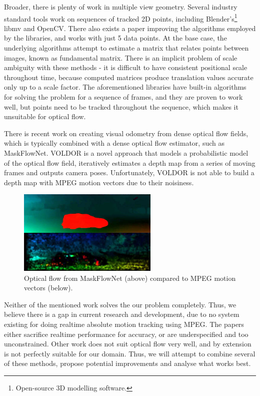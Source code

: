 \documentclass[11pt,english]{report}
\begin{document}
Broader, there is plenty of work in multiple view geometry. Several industry standard tools work on sequences of tracked 2D points, including Blender's\footnote{Open-source 3D modelling software.} libmv\cite{libmv} and OpenCV\cite{opencv5calib}. There also exists a paper improving the algorithms employed by the libraries, and works with just 5 data points\cite{1211470}. At the base case, the underlying algorithms attempt to estimate a matrix that relates points between images, known as fundamental matrix. There is an implicit problem of scale ambiguity\cite{hartley_zisserman_2004} with these methods - it is difficult to have consistent positional scale throughout time, because computed matrices produce translation values accurate only up to a scale factor. The aforementioned libraries have built-in algorithms for solving the problem for a sequence of frames, and they are proven to work well, but points need to be tracked throughout the sequence, which makes it unsuitable for optical flow.

There is recent work on creating visual odometry from dense optical flow fields\cite{voldor}, which is typically combined with a dense optical flow estimator, such as MaskFlowNet\cite{zhao2020maskflownet}. VOLDOR\cite{voldor} is a novel approach that models a probabilistic model of the optical flow field, iteratively estimates a depth map from a series of moving frames and outputs camera poses. Unfortunately, VOLDOR is not able to build a depth map with MPEG motion vectors due to their noisiness.

\begin{figure}[!ht]
	\centering
	\includegraphics[width=190pt]{docs/report/mpeg-maskflownet.jpg}
	\caption{\centering Optical flow from MaskFlowNet (above) compared to MPEG motion vectors (below).}
\end{figure}

Neither of the mentioned work solves the our problem completely. Thus, we believe there is a gap in current research and development, due to no system existing for doing realtime absolute motion tracking using MPEG. The papers either sacrifice realtime performance for accuracy, or are underspecified and too unconstrained. Other work does not suit optical flow very well, and by extension is not perfectly suitable for our domain. Thus, we will attempt to combine several of these methods, propose potential improvements and analyse what works best.
\end{document}
